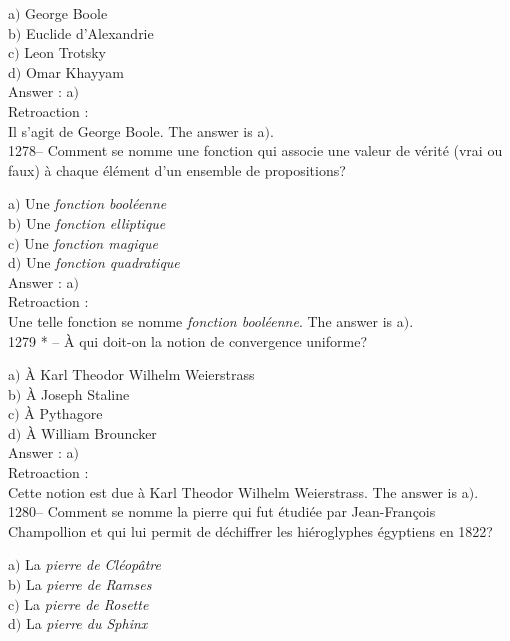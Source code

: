 ﻿\documentclass[letterpaper, 12pt]{article}
\begin{document}
a$)$ George Boole \\
b$)$ Euclide d'Alexandrie \\
c$)$ Leon Trotsky \\
d$)$ Omar Khayyam\\

Answer : a$)$\\

Retroaction : \\
Il s'agit de George Boole.
The answer is  a$)$.\\

1278-- Comment se nomme une fonction qui associe une valeur de v\'erit\'e
(vrai ou faux) \`a chaque
\'el\'ement d'un ensemble de propositions?

a$)$ Une {\sl fonction bool\'eenne} \\
b$)$ Une {\sl fonction elliptique} \\
c$)$ Une {\sl fonction magique} \\
d$)$ Une {\sl fonction quadratique}\\

Answer : a$)$\\

Retroaction : \\
Une telle fonction se nomme {\sl fonction bool\'eenne}.
The answer is  a$)$.\\

1279 * -- \`A qui doit-on la notion de convergence uniforme?

a$)$ \`A Karl Theodor Wilhelm Weierstrass \\
b$)$ \`A Joseph Staline \\
c$)$ \`A Pythagore \\
d$)$ \`A William Brouncker\\

Answer : a$)$\\

Retroaction : \\
Cette notion est due \`a Karl Theodor Wilhelm Weierstrass.
The answer is  a$)$.\\

1280-- Comment se nomme la pierre qui fut \'etudi\'ee par
Jean-Fran\c cois Champollion et qui lui permit de d\'echiffrer les
hi\'eroglyphes \'egyptiens en 1822?

a$)$ La {\sl pierre de Cl\'eop\^atre} \\
b$)$ La {\sl pierre de Ramses} \\
c$)$ La {\sl pierre de Rosette} \\
d$)$ La {\sl pierre du Sphinx}\\
\end{document}
